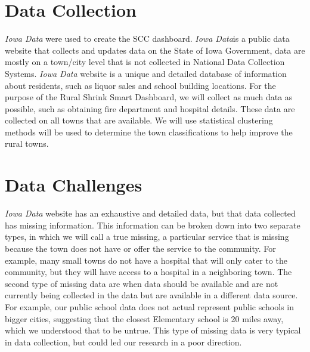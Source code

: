 \documentclass[10pt]{article}
\begin{document}
\section{Data Collection}
{\it Iowa Data} were used to create the SCC dashboard. {\it Iowa Data}is a public data website that collects and updates data on the State of Iowa Government, data are mostly on a town/city level that is not collected in National Data Collection Systems. {\it Iowa Data} website is a unique and detailed database of information about residents, such as liquor sales and school building locations. For the purpose of the Rural Shrink Smart Dashboard, we will collect as much data as possible, such as obtaining fire department and hospital details. These data are collected on all towns that are available. We will use statistical clustering methods will be used to determine the town classifications to help improve the rural towns.

\section{Data Challenges}
{\it Iowa Data} website has an exhaustive and detailed data, but that data collected has missing information. This information can be broken down into two separate types, in which we will call a true missing, a particular service that is missing because the town does not have or offer the service to the community. For example, many small towns do not have a hospital that will only cater to the community, but they will have access to a hospital in a neighboring town. The second type of missing data are when data should be available and are not currently being collected in the data but are available in a different data source. For example, our public school data does not actual represent public schools in bigger cities, suggesting that the closest Elementary school is 20 miles away, which we understood that to be untrue. This type of missing data is very typical in data collection, but could led our research in a poor direction.
\end{document}
